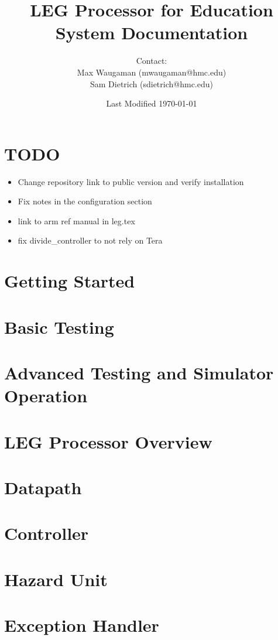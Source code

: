 \documentclass[12pt,letterpaper]{article}
\begin{document}
\title{LEG Processor for Education\\\Large{System Documentation}
}
\author{Contact: \\Max Waugaman (mwaugaman@hmc.edu) \\Sam Dietrich (sdietrich@hmc.edu)}
\date{Last Modified \today}
\maketitle
\thispagestyle{empty}
\pagebreak
\setcounter{page}{1}
\pagebreak

\tableofcontents
\pagebreak

\section{TODO}
\begin{itemize}
\item Change repository link to public version and verify installation
\item Fix notes in the configuration section
\item link to arm ref manual in leg.tex
\item fix divide\_controller to not rely on Tera
\end{itemize}

\section{Getting Started}


\section{Basic Testing}

\pagebreak

\section{Advanced Testing and Simulator Operation}

\pagebreak

\section{LEG Processor Overview}


\section{Datapath}


\section{Controller}


\section{Hazard Unit}


\section{Exception Handler}



\pagebreak


\pagebreak


\pagebreak
\end{document}
